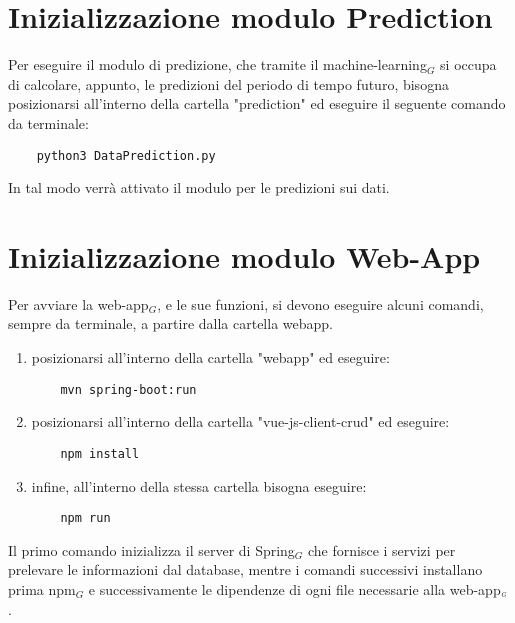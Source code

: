 \section{Inizializzazione modulo Prediction}\label{ProceduraDiInstallazioneInizializzazioneModuloPrediction}
Per eseguire il modulo di predizione, che tramite il machine-learning$_G$ si occupa di calcolare, appunto, le predizioni del periodo di tempo futuro, bisogna posizionarsi all'interno della cartella "prediction" ed eseguire il seguente comando da terminale:

\begin{lstlisting}
    python3 DataPrediction.py
\end{lstlisting}
In tal modo verrà attivato il modulo per le predizioni sui dati.


\section{Inizializzazione modulo Web-App}\label{ProceduraDiInstallazioneInizializzazioneModuloWebApp}
Per avviare la web-app$_G$, e le sue funzioni, si devono eseguire alcuni comandi, sempre da terminale, a partire dalla cartella webapp.
\begin{enumerate}
  \item posizionarsi all'interno della cartella "webapp" ed eseguire:
  \begin{lstlisting}
    mvn spring-boot:run
  \end{lstlisting}
  \item posizionarsi all'interno della cartella "vue-js-client-crud" ed eseguire:
  \begin{lstlisting}
    npm install
  \end{lstlisting}
  \item infine, all'interno della stessa cartella bisogna eseguire:
  \begin{lstlisting}
    npm run
  \end{lstlisting}
\end{enumerate}
Il primo comando inizializza il server di Spring$_G$ che fornisce i servizi per prelevare le informazioni dal database, mentre i comandi successivi installano prima npm$_G$ e successivamente le dipendenze di ogni file necessarie alla web-app$_{\scaleto{G}{3pt}}$.
